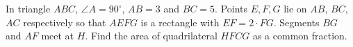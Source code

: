 In triangle $ABC$, $\angle A=90^\circ$, $AB=3$ and $BC=5$. Points $E,F,G$ lie on $AB$, $BC$, $AC$ respectively so that $AEFG$ is a rectangle with $EF=2\cdot FG$. Segments $BG$ and $AF$ meet at $H$. Find the area of quadrilateral $HFCG$ as a common fraction.
